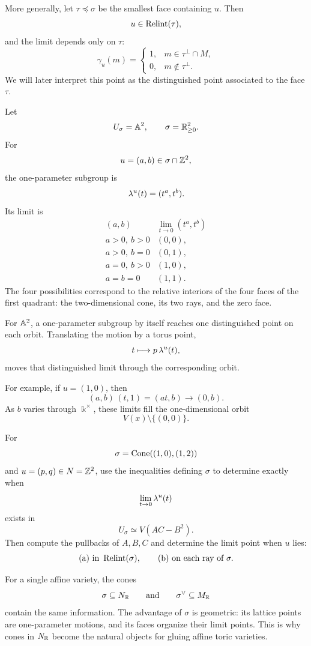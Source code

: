 More generally, let \(\tau\preceq\sigma\) be the smallest face
containing \(u\). Then
\[
u\in\operatorname{Relint}(\tau),
\]
and the limit depends only on \(\tau\):
\[
\gamma_u(m)
=
\begin{cases}
1,&m\in\tau^\perp\cap M,\\
0,&m\notin\tau^\perp.
\end{cases}
\]
We will later interpret this point as the distinguished point
associated to the face \(\tau\).

\begin{example}
Let
\[
U_\sigma=\mathbb{A}^2,
\qquad
\sigma=\mathbb{R}_{\geq0}^2.
\]
For
\[
u=(a,b)\in\sigma\cap\mathbb{Z}^2,
\]
the one-parameter subgroup is
\[
\lambda^{u}(t)=(t^a,t^b).
\]
Its limit is
\[
\begin{array}{c|c}
(a,b)
&
\displaystyle\lim_{t\to0}(t^a,t^b)
\\
\hline
a>0,\ b>0&(0,0),\\
a>0,\ b=0&(0,1),\\
a=0,\ b>0&(1,0),\\
a=b=0&(1,1).
\end{array}
\]
The four possibilities correspond to the relative interiors of the
four faces of the first quadrant: the two-dimensional cone, its two
rays, and the zero face.
\end{example}

\begin{surfacelaboratory}
For \(\mathbb{A}^2\), a one-parameter subgroup by itself reaches one
distinguished point on each orbit. Translating the motion by a torus
point,
\[
t\longmapsto p\,\lambda^{u}(t),
\]
moves that distinguished limit through the corresponding orbit.

For example, if \(u=(1,0)\), then
\[
(a,b)\,(t,1)=(at,b)
\longrightarrow(0,b).
\]
As \(b\) varies through \(\Bbbk^\times\), these limits fill the
one-dimensional orbit
\[
V(x)\setminus\{(0,0)\}.
\]
\end{surfacelaboratory}

\begin{pauseandthink}
For
\[
\sigma=\operatorname{Cone}((1,0),(1,2))
\]
and \(u=(p,q)\in N=\mathbb{Z}^2\), use the inequalities defining \(\sigma\)
to determine exactly when
\[
\lim_{t\to0}\lambda^{u}(t)
\]
exists in
\[
U_\sigma\simeq V(AC-B^2).
\]
Then compute the pullbacks of \(A,B,C\) and determine the limit point
when \(u\) lies:
\[
\text{(a) in }\operatorname{Relint}(\sigma),\qquad
\text{(b) on each ray of }\sigma.
\]
\end{pauseandthink}

For a single affine variety, the cones
\[
\sigma\subseteq N_{\mathbb{R}}
\qquad\text{and}\qquad
\sigma^\vee\subseteq M_{\mathbb{R}}
\]
contain the same information. The advantage of \(\sigma\) is
geometric: its lattice points are one-parameter motions, and its faces
organize their limit points. This is why cones in \(N_{\mathbb{R}}\) become
the natural objects for gluing affine toric varieties.


